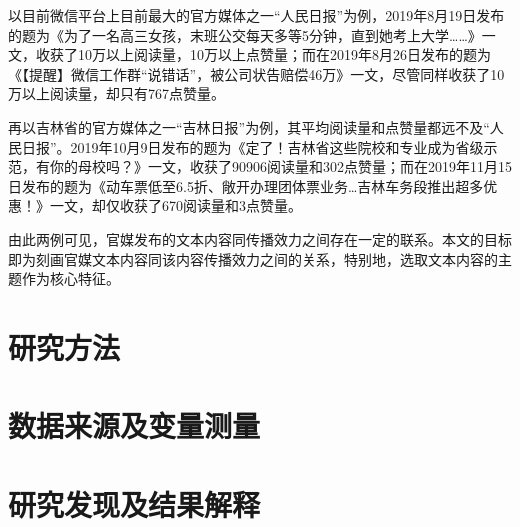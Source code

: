 \documentclass[a4paper,12pt]{article}
\begin{document}
    以目前微信平台上目前最大的官方媒体之一“人民日报”为例，2019年8月19日发布的题为《为了一名高三女孩，末班公交每天多等5分钟，直到她考上大学……》一文，收获了10万以上阅读量，10万以上点赞量；而在2019年8月26日发布的题为《【提醒】微信工作群“说错话”，被公司状告赔偿46万》一文，尽管同样收获了10万以上阅读量，却只有767点赞量。
    
    再以吉林省的官方媒体之一“吉林日报”为例，其平均阅读量和点赞量都远不及“人民日报”。2019年10月9日发布的题为《定了！吉林省这些院校和专业成为省级示范，有你的母校吗？》一文，收获了90906阅读量和302点赞量；而在2019年11月15日发布的题为《动车票低至6.5折、敞开办理团体票业务…吉林车务段推出超多优惠！》一文，却仅收获了670阅读量和3点赞量。
    
    由此两例可见，官媒发布的文本内容同传播效力之间存在一定的联系。本文的目标即为刻画官媒文本内容同该内容传播效力之间的关系，特别地，选取文本内容的主题作为核心特征。

    \section{研究方法}

    \section{数据来源及变量测量}

    \section{研究发现及结果解释}

    \label{applastpage}
    \newpage
    
    
\iffalse
\begin{itemize}[noitemsep,topsep=0pt]
\end{itemize}
\begin{enumerate}[label=\Roman{*}.,noitemsep,topsep=0pt]
\end{enumerate}
\begin{multicols}{2}
\end{multicols}
\begin{figure}
  \centering
  \texttt{[image: ]}
  \caption{}
  \label{fig:}
\end{figure}
\fi
\end{document}
